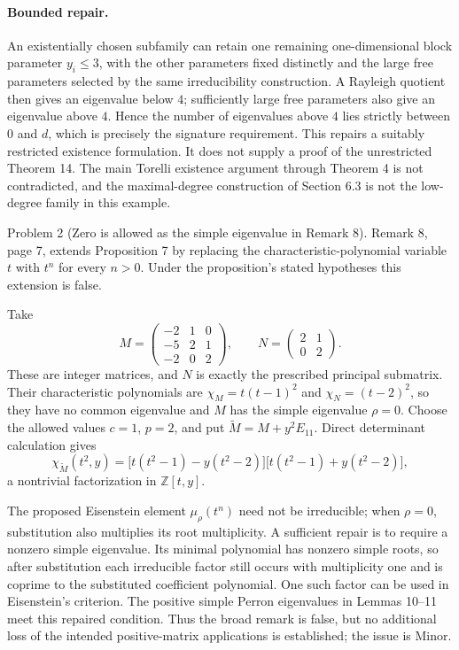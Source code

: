 \documentclass[10pt]{article}
\begin{document}
\paragraph*{Bounded repair.}\mbox{}\par
An existentially chosen subfamily can retain one remaining one-dimensional block parameter \(y_i\leq3\), with the other parameters fixed distinctly and the large free parameters selected by the same irreducibility construction. A Rayleigh quotient then gives an eigenvalue below \(4\); sufficiently large free parameters also give an eigenvalue above \(4\). Hence the number of eigenvalues above \(4\) lies strictly between \(0\) and \(d\), which is precisely the signature requirement. This repairs a suitably restricted existence formulation. It does not supply a proof of the unrestricted Theorem 14. The main Torelli existence argument through Theorem 4 is not contradicted, and the maximal-degree construction of Section 6.3 is not the low-degree family in this example.\par
Problem 2 (Zero is allowed as the simple eigenvalue in Remark 8).  Remark 8, page 7, extends Proposition 7 by replacing the characteristic-polynomial variable \(t\) with \(t^n\) for every \(n>0\). Under the proposition’s stated hypotheses this extension is false.\par
Take \[M=\begin{pmatrix}-2&1&0\\-5&2&1\\-2&0&2\end{pmatrix},
 \qquad N=\begin{pmatrix}2&1\\0&2\end{pmatrix}.\] These are integer matrices, and \(N\) is exactly the prescribed principal submatrix. Their characteristic polynomials are \(\chi_M=t(t-1)^2\) and \(\chi_N=(t-2)^2\), so they have no common eigenvalue and \(M\) has the simple eigenvalue \(\rho=0\). Choose the allowed values \(c=1\), \(p=2\), and put \(\widetilde M=M+y^2E_{11}\). Direct determinant calculation gives \[\chi_{\widetilde M}(t^2,y)
 =\bigl[t(t^2-1)-y(t^2-2)\bigr]
  \bigl[t(t^2-1)+y(t^2-2)\bigr],\] a nontrivial factorization in \(\mathbb Z[t,y]\).\par
The proposed Eisenstein element \(\mu_\rho(t^n)\) need not be irreducible; when \(\rho=0\), substitution also multiplies its root multiplicity. A sufficient repair is to require a nonzero simple eigenvalue. Its minimal polynomial has nonzero simple roots, so after substitution each irreducible factor still occurs with multiplicity one and is coprime to the substituted coefficient polynomial. One such factor can be used in Eisenstein’s criterion. The positive simple Perron eigenvalues in Lemmas 10–11 meet this repaired condition. Thus the broad remark is false, but no additional loss of the intended positive-matrix applications is established; the issue is Minor.\par
\end{document}
